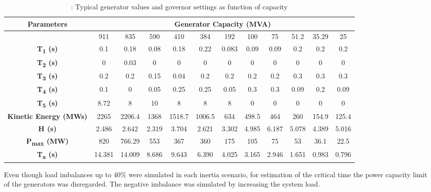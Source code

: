 \begin{table}[h]
\caption{\label{tb:timeconstant}: Typical generator values and governor settings as function of capacity \cite{Anderson.2002}}
\begin{adjustbox}{width=\textwidth, center}

\begin{tabular}{cccccccccccc}
\toprule
\textbf{Parameters}	& \multicolumn{11}{c}{\textbf{Generator Capacity (MVA)}} \\

\midrule
{} & 911&	835&	590&	410&	384&	192&	100&	75&	51.2&	35.29&	25 \\
\midrule

\textbf{T\textsubscript{1} (s)}&	0.1&	0.18&	0.08&	0.18&	0.22&	0.083&	0.09&	0.09&	0.2&	0.2&	0.2\\
\textbf{T\textsubscript{2} (s)}&	0&	0.03&	0&	0&	0&	0&	0&	0&	0&	0&	0\\
\textbf{T\textsubscript{3} (s)}&	0.2&	0.2&	0.15&	0.04&	0.2&	0.2&	0.2&	0.2&	0.3&	0.3&	0.3\\
\textbf{T\textsubscript{4} (s)}&	0.1&	0&	0.05&	0.25&	0.25&	0.05&	0.3&	0.3&	0.09&	0.2&	0.09\\
\textbf{T\textsubscript{5} (s)}&	8.72&	8&	10&	8&	8&	8&	0&	0&	0&	0&	0\\
\textbf{Kinetic Energy (MWs)}&	2265&	2206.4&	1368&	1518.7&	1006.5&	634	&498.5&	464&	260&	154.9&	125.4\\
\textbf{H (s)}&	2.486&	2.642&	2.319&	3.704&	2.621&	3.302&	4.985&	6.187&	5.078&	4.389&	5.016\\
\textbf{P\textsubscript{max} (MW)}&	820&	766.29&	553&	367&	360&	175&	105&	75&	53&	36.1&	22.5\\
\textbf{T\textsubscript{a} (s)}&	14.381&	14.009&	8.686&	9.643&	6.390&	4.025&	3.165&	2.946&	1.651&	0.983&	0.796\\
\bottomrule
\end{tabular}
\end{adjustbox}
\end{table}






Even though load imbalances up to 40\% were simulated in each inertia scenario, for estimation of the critical time the power capacity limit of the generators was disregarded. The negative imbalance was simulated by increasing the system load.

